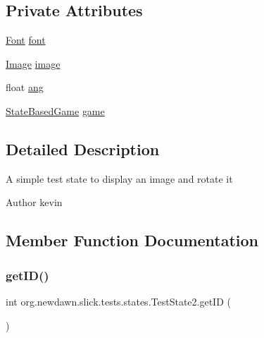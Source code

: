 \subsection*{Private Attributes}
\begin{DoxyCompactItemize}
\item 
\mbox{\hyperlink{interfaceorg_1_1newdawn_1_1slick_1_1_font}{Font}} \mbox{\hyperlink{classorg_1_1newdawn_1_1slick_1_1tests_1_1states_1_1_test_state2_aa14db4ea7fb8de3229c7ff730c9022ca}{font}}
\item 
\mbox{\hyperlink{classorg_1_1newdawn_1_1slick_1_1_image}{Image}} \mbox{\hyperlink{classorg_1_1newdawn_1_1slick_1_1tests_1_1states_1_1_test_state2_a50fa0f90372b1d3884cbc771f56e6324}{image}}
\item 
float \mbox{\hyperlink{classorg_1_1newdawn_1_1slick_1_1tests_1_1states_1_1_test_state2_a68f880036b5ae74ff1be02476e1758a2}{ang}}
\item 
\mbox{\hyperlink{classorg_1_1newdawn_1_1slick_1_1state_1_1_state_based_game}{State\+Based\+Game}} \mbox{\hyperlink{classorg_1_1newdawn_1_1slick_1_1tests_1_1states_1_1_test_state2_a76ea26ba609bd0c48b8690f2e797763a}{game}}
\end{DoxyCompactItemize}


\subsection{Detailed Description}
A simple test state to display an image and rotate it

\begin{DoxyAuthor}{Author}
kevin 
\end{DoxyAuthor}


\subsection{Member Function Documentation}
\mbox{\label{classorg_1_1newdawn_1_1slick_1_1tests_1_1states_1_1_test_state2_a953f427bf8f09b723e036ee8eb5b455c}} 
\subsubsection{\texorpdfstring{get\+I\+D()}{getID()}}
{\footnotesize\ttfamily int org.\+newdawn.\+slick.\+tests.\+states.\+Test\+State2.\+get\+ID (\begin{DoxyParamCaption}{ }\end{DoxyParamCaption})\hspace{0.3cm}{\ttfamily [inline]}}

